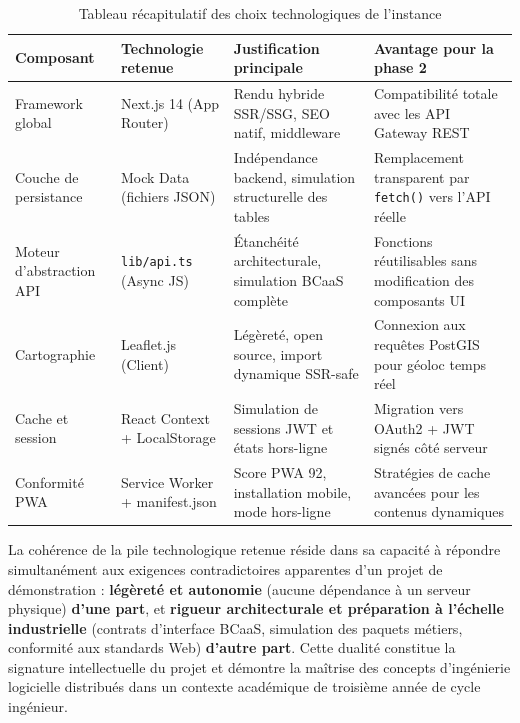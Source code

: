 \documentclass[12pt,a4paper]{report}
\newcommand{\tableheader}[1]{%
  \cellcolor{HeaderBg}\textbf{\color{white}#1}}
\begin{document}
\begin{table}[H]
\centering
\caption{Tableau récapitulatif des choix technologiques de l'instance}
\label{tab:techno}
\renewcommand{\arraystretch}{1.6}
\small
\begin{tabular}{>{\raggedright\arraybackslash}p{3.2cm}
                >{\raggedright\arraybackslash}p{3.5cm}
                >{\raggedright\arraybackslash}p{3.2cm}
                >{\raggedright\arraybackslash}p{3.2cm}}
\toprule
\tableheader{Composant} &
\tableheader{Technologie retenue} &
\tableheader{Justification principale} &
\tableheader{Avantage pour la phase 2} \\
\midrule
\rowcolor{PBCLightGray}
Framework global & Next.js 14 (App Router) & Rendu hybride SSR/SSG, SEO natif, middleware & Compatibilité totale avec les API Gateway REST \\
Couche de persistance & Mock Data (fichiers JSON) & Indépendance backend, simulation structurelle des tables & Remplacement transparent par \texttt{fetch()} vers l'API réelle \\
\rowcolor{PBCLightGray}
Moteur d'abstraction API & \texttt{lib/api.ts} (Async JS) & Étanchéité architecturale, simulation BCaaS complète & Fonctions réutilisables sans modification des composants UI \\
Cartographie & Leaflet.js (Client) & Légèreté, open source, import dynamique SSR-safe & Connexion aux requêtes PostGIS pour géoloc temps réel \\
\rowcolor{PBCLightGray}
Cache et session & React Context + LocalStorage & Simulation de sessions JWT et états hors-ligne & Migration vers OAuth2 + JWT signés côté serveur \\
Conformité PWA & Service Worker + manifest.json & Score PWA 92, installation mobile, mode hors-ligne & Stratégies de cache avancées pour les contenus dynamiques \\
\bottomrule
\end{tabular}
\end{table}

\begin{insightbox}
La cohérence de la pile technologique retenue réside dans sa capacité à répondre simultanément aux exigences contradictoires apparentes d'un projet de démonstration : \textbf{légèreté et autonomie} (aucune dépendance à un serveur physique) \textbf{d'une part}, et \textbf{rigueur architecturale et préparation à l'échelle industrielle} (contrats d'interface BCaaS, simulation des paquets métiers, conformité aux standards Web) \textbf{d'autre part}. Cette dualité constitue la signature intellectuelle du projet et démontre la maîtrise des concepts d'ingénierie logicielle distribués dans un contexte académique de troisième année de cycle ingénieur.
\end{insightbox}
\end{document}
